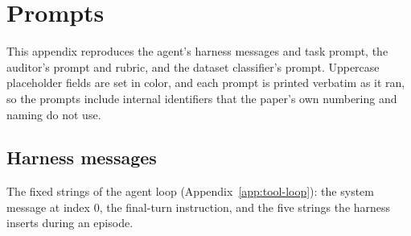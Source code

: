 \section{Prompts}
\label{app:prompt-listings}

This appendix reproduces the agent's harness messages and task prompt, the auditor's
prompt and rubric, and the dataset classifier's prompt. Uppercase placeholder fields
are set in color, and each prompt is printed verbatim as it ran, so the
prompts include internal identifiers that the paper's own numbering and
naming do not use.

\subsection{Harness messages}
The fixed strings of the agent loop (Appendix~\ref{app:tool-loop}): the
system message at index 0, the final-turn instruction, and the five strings
the harness inserts during an episode.

